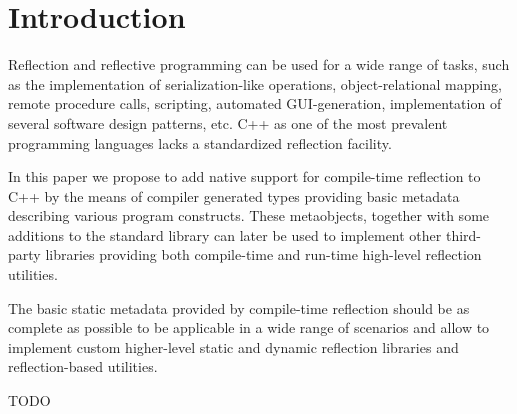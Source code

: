 \section{Introduction}

Reflection and reflective programming can be used
for a wide range of tasks, such as the implementation
of serialization-like operations, object-relational mapping,
remote procedure calls, scripting, automated GUI-generation,
implementation of several software design patterns, etc.
C++ as one of the most prevalent programming languages 
lacks a standardized reflection facility.

In this paper we propose to add native support for
compile-time reflection to C++ by the means of compiler generated
types providing basic metadata describing various program constructs.
These metaobjects, together with some additions to the standard
library can later be used to implement other third-party libraries
providing both compile-time and run-time high-level
reflection utilities.

The basic static metadata provided by compile-time reflection
should be as complete as possible to be applicable in a wide
range of scenarios and allow to implement custom higher-level
static and dynamic reflection libraries and reflection-based
utilities.

TODO

